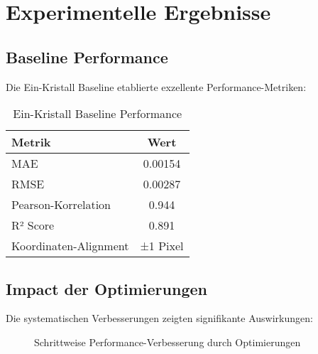 
\chapter{Experimentelle Ergebnisse}
\label{ch:results}

\section{Baseline Performance}

Die Ein-Kristall Baseline etablierte exzellente Performance-Metriken:

\begin{table}[htbp]
\centering
\caption{Ein-Kristall Baseline Performance}
\label{tab:baseline}
\begin{tabular}{@{}lc@{}}
\toprule
\textbf{Metrik} & \textbf{Wert} \\
\midrule
MAE & 0.00154 \\
RMSE & 0.00287 \\
Pearson-Korrelation & 0.944 \\
R² Score & 0.891 \\
Koordinaten-Alignment & ±1 Pixel \\
\bottomrule
\end{tabular}
\end{table}

\section{Impact der Optimierungen}

Die systematischen Verbesserungen zeigten signifikante Auswirkungen:

\begin{figure}[htbp]
\centering
{}
\caption{Schrittweise Performance-Verbesserung durch Optimierungen}
\label{fig:optimization_impact}
\end{figure}
